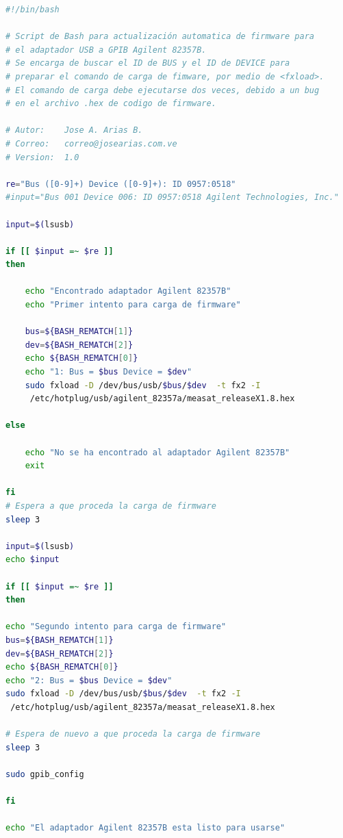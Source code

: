 \documentclass[paper=letter,oneside,fontsize=11pt, parskip=full]{scrartcl}
\begin{document}
	\begin{lstlisting}[language=bash,caption={bash version}]
#!/bin/bash 

# Script de Bash para actualización automatica de firmware para 
# el adaptador USB a GPIB Agilent 82357B.
# Se encarga de buscar el ID de BUS y el ID de DEVICE para 
# preparar el comando de carga de fimware, por medio de <fxload>. 
# El comando de carga debe ejecutarse dos veces, debido a un bug 
# en el archivo .hex de codigo de firmware.

# Autor: 	Jose A. Arias B.
# Correo: 	correo@josearias.com.ve
# Version:	1.0

re="Bus ([0-9]+) Device ([0-9]+): ID 0957:0518"
#input="Bus 001 Device 006: ID 0957:0518 Agilent Technologies, Inc."

input=$(lsusb)

if [[ $input =~ $re ]] 
then 

	echo "Encontrado adaptador Agilent 82357B"
	echo "Primer intento para carga de firmware"

	bus=${BASH_REMATCH[1]}
	dev=${BASH_REMATCH[2]}
	echo ${BASH_REMATCH[0]}
	echo "1: Bus = $bus Device = $dev"
	sudo fxload -D /dev/bus/usb/$bus/$dev  -t fx2 -I 
	 /etc/hotplug/usb/agilent_82357a/measat_releaseX1.8.hex

else 

	echo "No se ha encontrado al adaptador Agilent 82357B"
	exit

fi
# Espera a que proceda la carga de firmware
sleep 3

input=$(lsusb)
echo $input

if [[ $input =~ $re ]]
then

echo "Segundo intento para carga de firmware"
bus=${BASH_REMATCH[1]}
dev=${BASH_REMATCH[2]}
echo ${BASH_REMATCH[0]}
echo "2: Bus = $bus Device = $dev"
sudo fxload -D /dev/bus/usb/$bus/$dev  -t fx2 -I
 /etc/hotplug/usb/agilent_82357a/measat_releaseX1.8.hex

# Espera de nuevo a que proceda la carga de firmware
sleep 3

sudo gpib_config

fi

echo "El adaptador Agilent 82357B esta listo para usarse"
	\end{lstlisting}	

		
\end{document}
